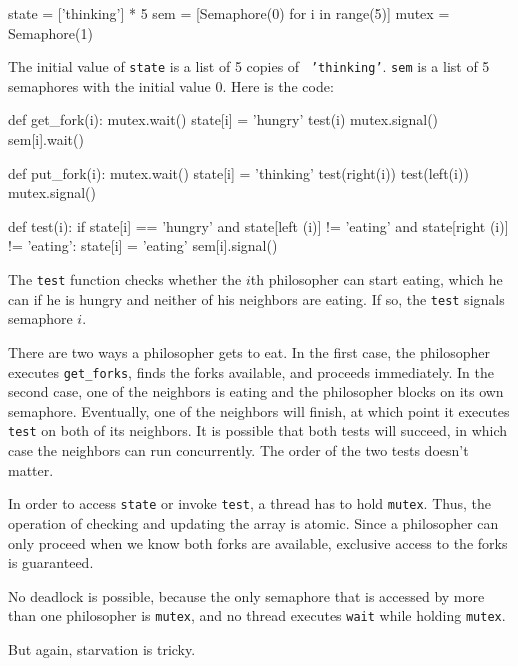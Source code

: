 \documentclass{book}
\begin{document}
\begin{unbreakable}[title={Variables for Tanenbaum's solution}]{}
state = ['thinking'] * 5
sem = [Semaphore(0) for i in range(5)]
mutex = Semaphore(1)
\end{unbreakable}

The initial value of {\tt state} is a list of 5 copies of {\tt
        'thinking'}.  {\tt sem} is a list of 5 semaphores with the initial
value 0.  Here is the code:

\begin{unbreakable}[title={Tanenbaum's solution}]{}
def get_fork(i):
    mutex.wait()
    state[i] = 'hungry'
    test(i)
    mutex.signal()
    sem[i].wait()

def put_fork(i):
    mutex.wait()
    state[i] = 'thinking'
    test(right(i))
    test(left(i))
    mutex.signal()

def test(i):
    if state[i] == 'hungry' and
    state[left (i)]  != 'eating' and
    state[right (i)] != 'eating':
        state[i] = 'eating'
        sem[i].signal()
\end{unbreakable}


The {\tt test} function checks whether the $i$th philosopher can
start eating, which he can if he is hungry and
neither of his neighbors are eating.  If so, the {\tt test} signals
semaphore $i$.

There are two ways a philosopher gets to eat.  In the first case, the
philosopher executes {\tt get\_forks}, finds the forks available, and
proceeds immediately.  In the second case, one of the neighbors is
eating and the philosopher blocks on its own semaphore.  Eventually,
one of the neighbors will finish, at which point it executes {\tt
        test} on both of its neighbors.  It is possible that both tests
will succeed, in which case the neighbors can run concurrently.
The order of the two tests doesn't matter.

In order to access {\tt state} or invoke {\tt test}, a thread
has to hold {\tt mutex}.  Thus, the operation of checking and
updating the array is atomic.  Since a philosopher can only proceed
when we know both forks are available, exclusive access to the forks
is guaranteed.

No deadlock is possible, because the only semaphore that is accessed
by more than one philosopher is {\tt mutex}, and no thread executes
    {\tt wait} while holding {\tt mutex}.

But again, starvation is tricky.
\end{document}
